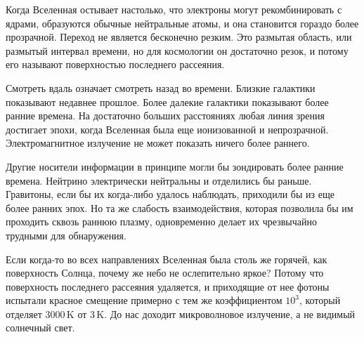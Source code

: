 Когда Вселенная остывает настолько, что электроны могут рекомбинировать с ядрами, образуются обычные нейтральные атомы, и она становится гораздо более прозрачной. Переход не является бесконечно резким. Это размытая область, или размытый интервал времени, но для космологии он достаточно резок, и потому его называют поверхностью последнего рассеяния.

Смотреть вдаль означает смотреть назад во времени. Близкие галактики показывают недавнее прошлое. Более далекие галактики показывают более ранние времена. На достаточно больших расстояниях любая линия зрения достигает эпохи, когда Вселенная была еще ионизованной и непрозрачной. Электромагнитное излучение не может показать ничего более раннего.

Другие носители информации в принципе могли бы зондировать более ранние времена. Нейтрино электрически нейтральны и отделились бы раньше. Гравитоны, если бы их когда-либо удалось наблюдать, приходили бы из еще более ранних эпох. Но та же слабость взаимодействия, которая позволила бы им проходить сквозь раннюю плазму, одновременно делает их чрезвычайно трудными для обнаружения.

Если когда-то во всех направлениях Вселенная была столь же горячей, как поверхность Солнца, почему же небо не ослепительно яркое? Потому что поверхность последнего рассеяния удаляется, и приходящие от нее фотоны испытали красное смещение примерно с тем же коэффициентом \(10^3\), который отделяет \(3000\,\mathrm K\) от \(3\,\mathrm K\). До нас доходит микроволновое излучение, а не видимый солнечный свет.

\begin{classroomqa}
\end{classroomqa}

\begin{classroomqa}
\end{classroomqa}

